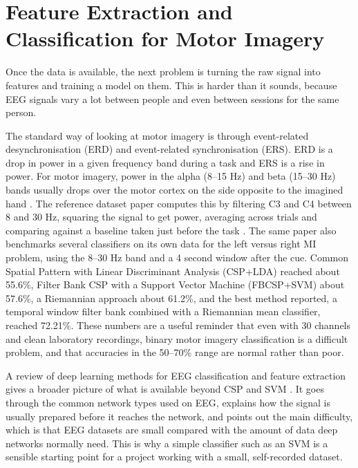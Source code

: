 \section{Feature Extraction and Classification for Motor Imagery}

Once the data is available, the next problem is turning the raw signal into features and
training a model on them. This is harder than it sounds, because EEG signals vary a lot
between people and even between sessions for the same person.

The standard way of looking at motor imagery is through event-related desynchronisation
(ERD) and event-related synchronisation (ERS). ERD is a drop in power in a given frequency
band during a task and ERS is a rise in power. For motor imagery, power in the alpha
(8--15 Hz) and beta (15--30 Hz) bands usually drops over the motor cortex on the side
opposite to the imagined hand \cite{pfurtscheller1999erd}. The reference dataset paper computes this by filtering C3
and C4 between 8 and 30 Hz, squaring the signal to get power, averaging across trials and
comparing against a baseline taken just before the task \cite{liu2024mi}. The same paper
also benchmarks several classifiers on its own data for the left versus right MI problem,
using the 8--30 Hz band and a 4 second window after the cue. Common Spatial Pattern with
Linear Discriminant Analysis (CSP+LDA) \cite{ramoser2000csp} reached about 55.6\%, Filter
Bank CSP with a Support Vector Machine (FBCSP+SVM) \cite{cortes1995svm} about 57.6\%, a Riemannian approach about 61.2\%, and the best
method reported, a temporal window filter bank combined with a Riemannian mean classifier,
reached 72.21\%. These numbers are a useful reminder that even with 30 channels and clean
laboratory recordings, binary motor imagery classification is a difficult problem, and that
accuracies in the 50--70\% range are normal rather than poor.

A review of deep learning methods for EEG classification and feature extraction gives a
broader picture of what is available beyond CSP and SVM \cite{xu2023review}. It goes
through the common network types used on EEG, explains how the signal is usually prepared
before it reaches the network, and points out the main difficulty, which is that EEG
datasets are small compared with the amount of data deep networks normally need. This is
why a simple classifier such as an SVM is a sensible starting point for a project working
with a small, self-recorded dataset.

